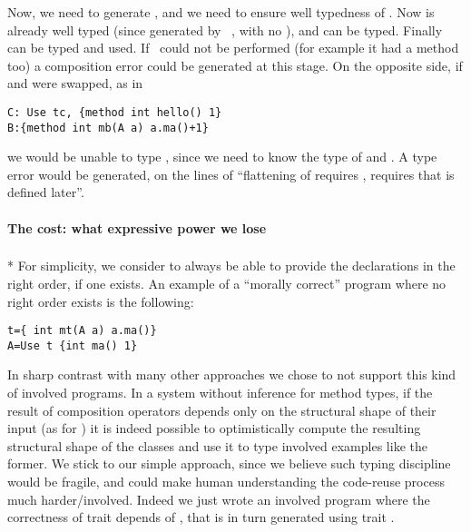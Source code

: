 Now, we need to generate \Q@C@, and we need to ensure well typedness of \Q@tc@.
Now \Q@A@ is already well typed (since generated by \use\ \Q@ta@, with no \mL),
and \Q@B@ can be typed. Finally \Q@tc@ can be typed and used.
If \use\ could not be performed (for example it \Q@tc@ had a method \Q@hello@ too)
a composition error could be generated at this stage.
On the opposite side, if \Q@B@ and \Q@C@ were swapped, as in
\saveSpace\begin{lstlisting}
C: Use tc, {method int hello() 1}
B:{method int mb(A a) a.ma()+1}
\end{lstlisting}\saveSpace
\noindent
we would be unable to type \Q@tc@, since we need to know the type of \Q@A@ and \Q@B@.
A type error would be generated, on the lines of ``flattening of \Q@C@
requires \Q@tc@, \Q@tc@ requires \Q@B@ that is defined later''.


\paragraph{The cost: what expressive power we lose}${}_{}$\\*
For simplicity, we consider to always be able to provide the declarations in the right order, if one exists.
An example of a ``morally correct'' program where no right order exists is the following:
\saveSpace\begin{lstlisting}
t={ int mt(A a) a.ma()}
A=Use t {int ma() 1}
\end{lstlisting}\saveSpace

In sharp contrast with
many other approaches
we chose to not support this kind of involved programs.
In a system without inference for method types,
if the result of composition operators depends only on the
structural shape of their input (as for \use)
it is indeed possible to optimistically compute the resulting structural shape of the classes
and use it to type involved examples like the former.
We stick to our simple approach, since we believe such typing discipline would be fragile,
and could make human understanding the code-reuse process much harder/involved.
Indeed we just wrote an involved program where the correctness of trait \Q@t@ depends of 
\Q@A@, that is in turn generated using trait \Q@t@.



